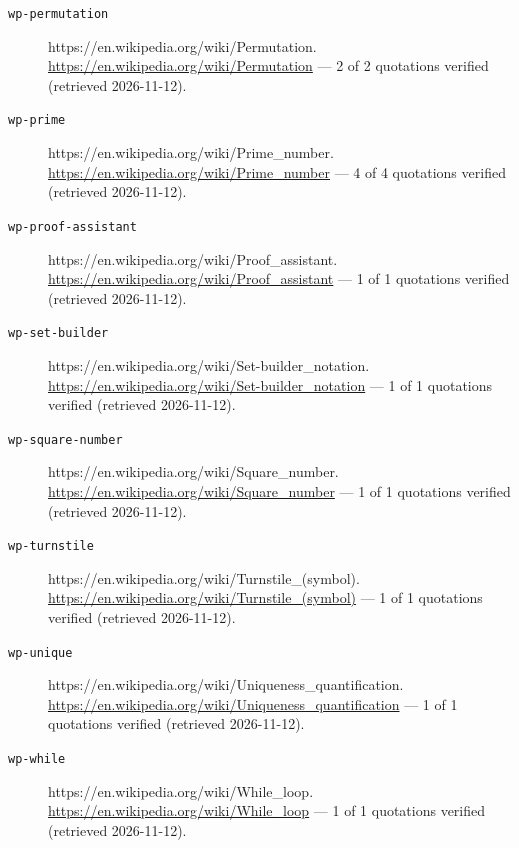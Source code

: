 \documentclass[11pt,letterpaper,openright]{book}
\theoremstyle{plain}
\theoremstyle{definition}
\theoremstyle{remark}
\begin{document}
\begin{description}
\item[\texttt{wp-permutation}] https://en.wikipedia.org/wiki/Permutation. \url{https://en.wikipedia.org/wiki/Permutation} --- 2 of 2 quotations verified (retrieved 2026-11-12).
\item[\texttt{wp-prime}] https://en.wikipedia.org/wiki/Prime\_number. \url{https://en.wikipedia.org/wiki/Prime_number} --- 4 of 4 quotations verified (retrieved 2026-11-12).
\item[\texttt{wp-proof-assistant}] https://en.wikipedia.org/wiki/Proof\_assistant. \url{https://en.wikipedia.org/wiki/Proof_assistant} --- 1 of 1 quotations verified (retrieved 2026-11-12).
\item[\texttt{wp-set-builder}] https://en.wikipedia.org/wiki/Set-builder\_notation. \url{https://en.wikipedia.org/wiki/Set-builder_notation} --- 1 of 1 quotations verified (retrieved 2026-11-12).
\item[\texttt{wp-square-number}] https://en.wikipedia.org/wiki/Square\_number. \url{https://en.wikipedia.org/wiki/Square_number} --- 1 of 1 quotations verified (retrieved 2026-11-12).
\item[\texttt{wp-turnstile}] https://en.wikipedia.org/wiki/Turnstile\_(symbol). \url{https://en.wikipedia.org/wiki/Turnstile_(symbol)} --- 1 of 1 quotations verified (retrieved 2026-11-12).
\item[\texttt{wp-unique}] https://en.wikipedia.org/wiki/Uniqueness\_quantification. \url{https://en.wikipedia.org/wiki/Uniqueness_quantification} --- 1 of 1 quotations verified (retrieved 2026-11-12).
\item[\texttt{wp-while}] https://en.wikipedia.org/wiki/While\_loop. \url{https://en.wikipedia.org/wiki/While_loop} --- 1 of 1 quotations verified (retrieved 2026-11-12).\end{description}
\printindex
\end{document}

